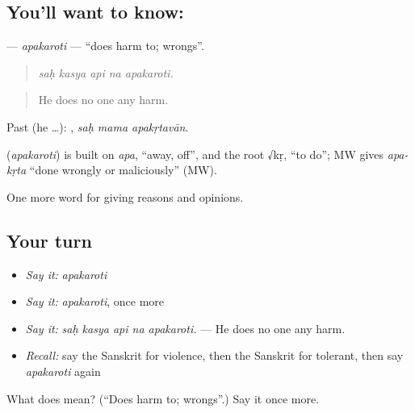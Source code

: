 \subsection*{You'll want to know: }
\textbf{} — \emph{apakaroti} — \textquotedblleft{}does harm to; wrongs\textquotedblright{}.

\begin{quote}
    
\end{quote}

\begin{quote}
\emph{saḥ kasya api na apakaroti.}
\end{quote}

\begin{quote}
He does no one any harm.
\end{quote}

Past (he …):   , \emph{saḥ mama apakṛtavān}.

\begin{cousinweb}
\textbf{} (\emph{apakaroti}) is built on \emph{apa}, \textquotedblleft{}away, off\textquotedblright{}, and the root √kṛ, \textquotedblleft{}to do\textquotedblright{}; MW gives \emph{apa-kṛta} \textquotedblleft{}done wrongly or maliciously\textquotedblright{} (MW).
\end{cousinweb}

\begin{grammarlens}[title={What you've built}]
One more word for giving reasons and opinions.
\end{grammarlens}

\subsection*{Your turn}
\begin{itemize}
\raggedright
  \item \emph{Say it:} \emph{apakaroti}
  \item \emph{Say it:} \emph{apakaroti}, once more
  \item \emph{Say it:} \emph{saḥ kasya api na apakaroti.} — He does no one any harm.
  \item \emph{Recall:} say the Sanskrit for violence, then the Sanskrit for tolerant, then say \emph{apakaroti} again
\end{itemize}

\begin{tcolorbox}[breakable,colback=teal!4,colframe=teal!35!black,title={Before you move on}]
What does  mean? (\textquotedblleft{}Does harm to; wrongs\textquotedblright{}.) Say it once more.
\end{tcolorbox}
